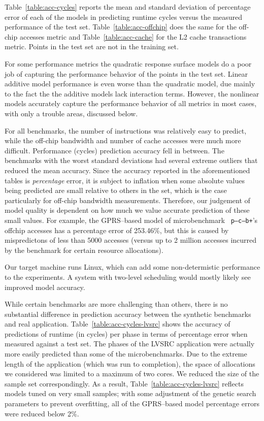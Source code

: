 Table~\ref{table:acc-cycles} reports the mean and standard deviation of percentage error of each of the models in predicting runtime cycles versus the measured performance of the test set. Table~\ref{table:acc-offchip} does the same for the off-chip accesses metric and Table~\ref{table:acc-cache} for the L2 cache transactions metric.  Points in the test set are not in the training set.

For some performance metrics the quadratic response surface models do a poor job of capturing the performance behavior of the points in the test set.  Linear additive model performance is even worse than the quadratic model, due mainly to the fact the the additive models lack interaction terms. However, the nonlinear models accurately capture the performance behavior of all metrics in most cases, with only a trouble areas, discussed below.

For all benchmarks, the number of instructions was relatively easy to predict, while the off-chip bandwidth and number of cache accesses were much more difficult.  Performance (cycles) prediction accuracy fell in between.  The benchmarks with the worst standard deviations had several extreme outliers that reduced the mean accuracy. Since the accuracy reported in the aforementioned tables is {\em percentage} error, it is subject to inflation when some absolute values being predicted are small relative to others in the set, which is the case particularly for off-chip bandwidth measurements.  Therefore, our judgement of model quality is dependent on how much we value accurate prediction of these small values.  For example, the GPRS--based model of microbenchmark \texttt{  p--c--b+}'s offchip accesses has a percentage error of 253.46\%, but this is caused by mispredictons of less than 5000 accesses (versus up to 2 million accesses incurred by the benchmark for certain resource allocations).

Our target machine runs Linux, which can add some non-determistic performance to the experiments.  A system with two-level scheduling would mostly likely see improved model accuracy.

While certain benchmarks are more challenging than others, there is no substantial difference in prediction accuracy between the synthetic benchmarks and real application. Table~\ref{table:acc-cycles-lvsrc} shows the accuracy of predictions of runtime (in cycles) per phase in terms of percentage error when measured against a test set.  The phases of the LVSRC application were actually more easily predicted than some of the microbenchmarks.  Due to the extreme length of the application (which was run to completion), the space of allocations we considered was limited to a maximum of two cores.  We reduced the size of the sample set correspondingly.  As a result, Table~\ref{table:acc-cycles-lvsrc} reflects models tuned on very small samples; with some adjustment of the genetic search parameters to prevent overfitting, all of the GPRS--based model percentage errors were reduced below 2\%.

